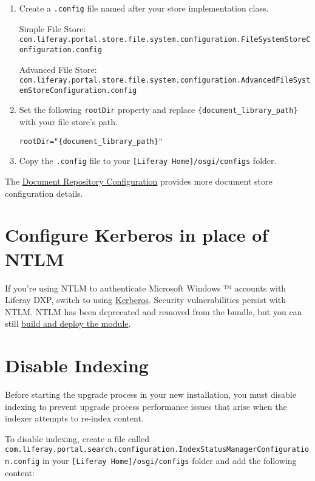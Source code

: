 \begin{enumerate}
\def\labelenumi{\arabic{enumi}.}
\item
  Create a \texttt{.config} file named after your store implementation
  class.

  Simple File Store:
  \texttt{com.liferay.portal.store.file.system.configuration.FileSystemStoreConfiguration.config}

  Advanced File Store:
  \texttt{com.liferay.portal.store.file.system.configuration.AdvancedFileSystemStoreConfiguration.config}
\item
  Set the following \texttt{rootDir} property and replace
  \texttt{\{document\_library\_path\}} with your file store's path.

\begin{verbatim}
rootDir="{document_library_path}"
\end{verbatim}
\item
  Copy the \texttt{.config} file to your
  \texttt{{[}Liferay\ Home{]}/osgi/configs} folder.
\end{enumerate}

The
\href{/docs/7-2/deploy/-/knowledge_base/d/document-repository-configuration}{Document
Repository Configuration} provides more document store configuration
details.

\section{Configure Kerberos in place of
NTLM}\label{configure-kerberos-in-place-of-ntlm}

If you're using NTLM to authenticate Microsoft Windows ™ accounts with
Liferay DXP, switch to using
\href{/docs/7-2/deploy/-/knowledge_base/d/authenticating-with-kerberos}{Kerberos}.
Security vulnerabilities persist with NTLM. NTLM has been deprecated and
removed from the bundle, but you can still
\href{https://github.com/liferay/liferay-portal/tree/7.2.x/modules/apps/portal-security-sso-ntlm}{build
and deploy the module}.

\section{Disable Indexing}\label{disable-indexing}

Before starting the upgrade process in your new installation, you must
disable indexing to prevent upgrade process performance issues that
arise when the indexer attempts to re-index content.

To disable indexing, create a file called
\texttt{com.liferay.portal.search.configuration.IndexStatusManagerConfiguration.config}
in your \texttt{{[}Liferay\ Home{]}/osgi/configs} folder and add the
following content:

